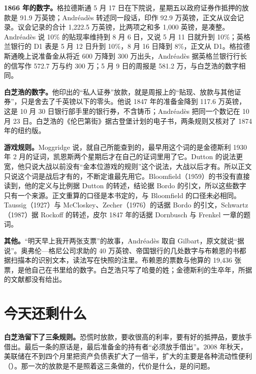 \begin{deeper}[史料说明]
\textbf{1866 年的数字。}格拉德斯通 5 月 17 日在下院说，星期五以政府证券作抵押的放款是 91.9 万英镑；Andréadès 转述同一段话，印作 92.9 万英镑，正文从议会记录\cite{hansard1866,andreades1909}。议会记录的合计 1,222.5 万英镑，比两项之和多 1,000 英镑，是凑整。Andréadès 说 10\% 的贴现率维持到 8 月 6 日，又说 5 月 11 日就升到 10\%；英格兰银行的 D1 表是 5 月 12 日升到 10\%，8 月 16 日降到 8\%，正文从 D1\cite{andreades1909,boe2017}。格拉德斯通晚上说准备金从将近 600 万降到 300 万出头，Andréadès 据英格兰银行行长的信写作 572.7 万与约 300 万；5 月 9 日的周报是 581.2 万，与白芝浩的数字相同。

\textbf{白芝浩的数字。}他印出的“私人证券”放款，就是周报上的“贴现、放款与其他证券”，只是舍去了千英镑以下的零头。他说 1847 年的准备金降到 117.6 万英镑，这是 10 月 30 日银行部手里的银行券，不含铸币；Andréadès 把同一个数记在 10 月 23 日。白芝浩的《伦巴第街》据古登堡计划的电子书，两条规则又核对了 1874 年的纽约版。

\textbf{游戏规则。}Moggridge 说，就自己所能查到的，最早用这个词的是金德斯利 1930 年 2 月的证词，凯恩斯两个星期后才在自己的证词里用了它\cite{dutton1984}。Dutton 的说法更宽，他只说大战以前没有“金本位游戏的规则”这个说法，大战以后才有\cite{dutton1984}。所以正文只说这个词是战后才有的，不断定谁最先用它。Bloomfield（1959）的书没有直接读到，他的定义与比例据 Dutton 的转述，结论据 Bordo 的引文，所以这些数字只有一个来源。正文重算的口径是本书定的，与 Bloomfield 的口径未必相同。Taussig（1927）与 McCloskey、Zecher（1976）的话据 Bordo 的引文，Schwartz（1987）据 Rockoff 的转述，皮尔 1847 年的话据 Dornbusch 与 Frenkel 一章的题词。

\textbf{其他。}“明天早上我开两张支票”的故事，Andréadès 取自 Gilbart，原文就说“据说”。奥弗伦—格尼公司求助的 40 万英镑、帝国银行的几处数字与布赖恩的书都据扫描本的识别文本，读法写在快照的注里。布赖恩的票数与他算的 19,436 张票，是他自己在书里给的数字。白芝浩只写了哈曼的姓；金德斯利的生卒年，所据的文献都没有给出。
\end{deeper}

\section{今天还剩什么}\label{sec:gold-legacy}

\textbf{白芝浩留下了三条规则。}恐慌时放款，要收很高的利率，要有好的抵押品，要放手借出。最后一条的原话是，最后准备金的持有者“必须放手借出”\cite{bagehot1873}。2008 年秋天，美联储在不到四个月里把资产负债表扩大了一倍半，扩大的主要是各种流动性便利（）。那一次的放款是不是照着这三条做的，代价是什么，是的问题。

